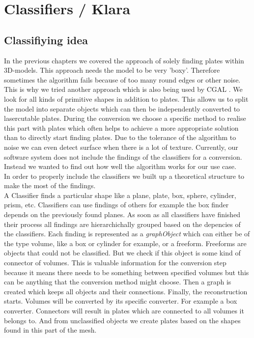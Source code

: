 \documentclass[../ClassicThesis.tex]{subfiles}
\begin{document}
\chapter{Classifiers / Klara}\label{ch:classifiers}
\newcommand{\TODO}[1]{\textcolor{red}{\\ \textbf{TODO:} #1 \\}}

\section{Classifiying idea}
\cite{positionVectorRetrieval}
In the previous chapters we covered the approach of solely finding plates within 3D-models. This approach needs the model to be very 'boxy'. Therefore sometimes the algorithm fails because of too many round edges or other noise. \\
This is why we tried another approach \cite{ransac} which is also being used by CGAL \cite{cgal}. We look for all kinds of primitive shapes in addition to plates. This allows us to split the model into separate objects which can then be independently converted to lasercutable plates. During the conversion we choose a specific method to realise this part with plates which often helps to achieve a more appropriate solution than to directly start finding plates. Due to the tolerance of the algorithm to noise we can even detect surface when there is a lot of texture.
Currently, our software system does not include the findings of the classifiers for a conversion. Instead we wanted to find out how well the algorithm works for our use case. \\
In order to properly include the classifiers we built up a theoretical structure to make the most of the findings. \\
A Classifier finds a particular shape like a plane, plate, box, sphere, cylinder, prism, etc. Classifiers can use findings of others for example the box finder depends on the previously found planes. As soon as all classifiers have finished their process all findings are hierarchichally grouped based on the depencies of the classifiers. Each finding is represented as a \emph{graphObject} which can either be of the type volume, like a box or cylinder for example, or a freeform. Freeforms are objects that could not be classified. But we check if this object is some kind of connector of volumes. This is valuable information for the conversion step because it means there needs to be something between specified volumes but this can be anything that the conversion method might choose. Then a graph is created which keeps all objects and their connections. Finally, the reconstruction starts. Volumes will be converted by its specific converter. For example a box converter. Connectors will result in plates which are connected to all volumes it belongs to. And from  unclassified objects we create plates based on the shapes found in this part of the mesh. \\
\end{document}
